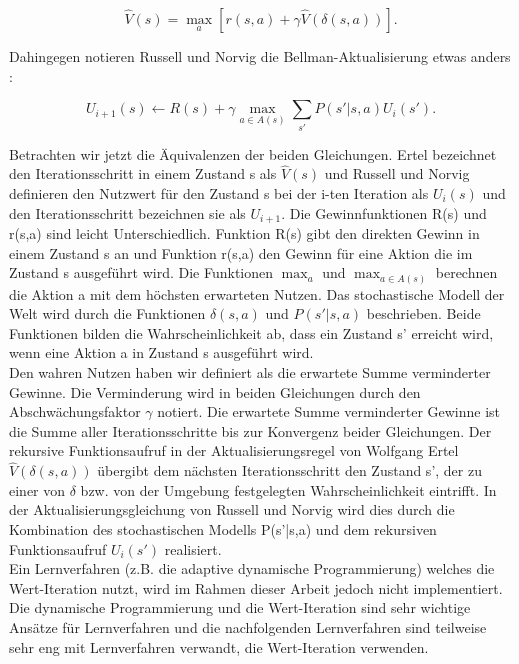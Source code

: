 \begin{equation}
\hat{V}(s) = \max_a [r(s,a) + \gamma \hat{V}(\delta(s,a))].
\end{equation}

Dahingegen notieren Russell und Norvig die Bellman-Aktualisierung etwas anders \cite[760]{Russell}:

\begin{equation}
U_{i+1}(s) \leftarrow R(s) + \gamma \max_{a \in A(s)} \sum_{s'} P(s'|s,a)U_i(s').
\end{equation} 

Betrachten wir jetzt die Äquivalenzen der beiden Gleichungen. Ertel bezeichnet den Iterationsschritt in einem Zustand s als $\hat{V}(s)$ und Russell und Norvig definieren den Nutzwert für den Zustand s bei der i-ten Iteration als $U_{i}(s)$ und den Iterationsschritt bezeichnen sie als $U_{i+1}$. Die Gewinnfunktionen R(s) und r(s,a) sind leicht Unterschiedlich. Funktion R(s) gibt den direkten Gewinn in einem Zustand s an und Funktion r(s,a) den Gewinn für eine Aktion die im Zustand s ausgeführt wird. Die Funktionen $\max_a$ und $\max_{a \in A(s)}$ berechnen die Aktion a mit dem höchsten erwarteten Nutzen. Das stochastische Modell der Welt wird durch die Funktionen $\delta(s,a)$ und $P(s'|s,a)$ beschrieben. Beide Funktionen bilden die Wahrscheinlichkeit ab, dass ein Zustand s' erreicht wird, wenn eine Aktion a in Zustand s ausgeführt wird. \\

Den wahren Nutzen haben wir definiert als die erwartete Summe verminderter Gewinne. Die Verminderung wird in beiden Gleichungen durch den Abschwächungsfaktor $\gamma$ notiert. Die erwartete Summe verminderter Gewinne ist die Summe aller Iterationsschritte bis zur Konvergenz beider Gleichungen. Der rekursive Funktionsaufruf in der Aktualisierungsregel von Wolfgang Ertel $\hat{V}(\delta(s,a))$ übergibt dem nächsten Iterationsschritt den Zustand s', der zu einer von $\delta$ bzw. von der Umgebung festgelegten Wahrscheinlichkeit eintrifft. In der Aktualisierungsgleichung von Russell und Norvig wird dies durch die Kombination des stochastischen Modells P(s'|s,a) und dem rekursiven Funktionsaufruf $U_i(s')$ realisiert.\\ 

Ein Lernverfahren (z.B. die adaptive dynamische Programmierung) welches die Wert-Iteration nutzt, wird im Rahmen dieser Arbeit jedoch nicht implementiert. Die dynamische Programmierung und die Wert-Iteration sind sehr wichtige Ansätze für Lernverfahren und die nachfolgenden Lernverfahren sind teilweise sehr eng mit Lernverfahren verwandt, die Wert-Iteration verwenden. \\

